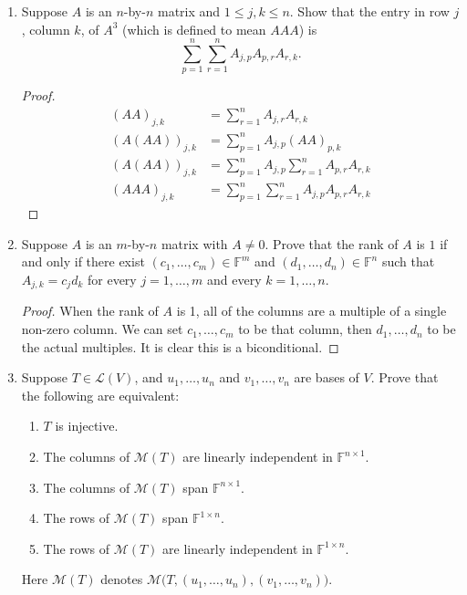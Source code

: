 \begin{enumerate}
    \item[13] Suppose $A$ is an $n$-by-$n$ matrix and $1 \le j, k \le n$. Show that the entry in
    row $j$, column $k$, of $A^3$ (which is defined to mean $AAA$) is
    \[
        \sum_{p=1}^n \sum_{r=1}^n A_{j,p} A_{p,r} A_{r,k}.
    \]

    \begin{proof}
        \begin{align*}
            (AA)_{j, k} &= \sum_{r = 1}^n A_{j, r}A_{r, k} \\
            (A(AA))_{j, k} &= \sum_{p=1}^n A_{j, p} (AA)_{p, k} \\
            (A(AA))_{j, k} &= \sum_{p=1}^n A_{j, p} \sum_{r = 1}^n A_{p, r}A_{r, k} \\
            (AAA)_{j, k} &= \sum_{p=1}^n \sum_{r = 1}^n A_{j, p}  A_{p, r}A_{r, k} 
        \end{align*}
        
    \end{proof}

    \item[16] Suppose $A$ is an $m$-by-$n$ matrix with $A \ne 0$. Prove that the rank of $A$ is $1$ if and only if there exist $(c_1, \dots, c_m) \in \mathbb{F}^m$ and $(d_1, \dots, d_n) \in \mathbb{F}^n$ such that
    $A_{j,k} = c_j d_k$
    for every $j = 1, \dots, m$ and every $k = 1, \dots, n$.

    \begin{proof}
        When the rank of $A$ is 1, all of the columns are a multiple of a single non-zero column. We can set $c_1, \dots, c_m$ to be that column, then $d_1, \dots, d_n$ to be the actual multiples. It is clear this is a biconditional.
    \end{proof}

    \item[17] Suppose $T\in\mathcal L(V)$, and $u_1,\dots,u_n$ and $v_1,\dots,v_n$ are bases of $V$. Prove that the following are equivalent:
    \begin{enumerate}
        \item $T$ is injective.
        \item The columns of $\mathcal M(T)$ are linearly independent in $\mathbb F^{n\times 1}$.
        \item The columns of $\mathcal M(T)$ span $\mathbb F^{n\times 1}$.
        \item The rows of $\mathcal M(T)$ span $\mathbb F^{1\times n}$.
        \item The rows of $\mathcal M(T)$ are linearly independent in $\mathbb F^{1\times n}$.
    \end{enumerate}
    Here $\mathcal M(T)$ denotes $\mathcal M\big(T,(u_1,\dots,u_n),(v_1,\dots,v_n)\big)$.


\end{enumerate}
